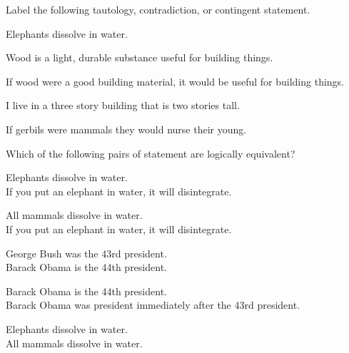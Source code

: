 \noindent \problempart Label the following tautology, contradiction, or contingent statement.
\begin{exercises}
\item Elephants dissolve in water. 
\item Wood is a light, durable substance useful for building things. 
\item If wood were a good building material, it would be useful for building things. 
\item I live in a three story building that is two stories tall. 
\item If gerbils were mammals they would nurse their young. 
\end{exercises}

\noindent \problempart Which of the following pairs of statement are logically equivalent? 

\begin{exercises}
\item Elephants dissolve in water.	\\
	If you put an elephant in water, it will disintegrate.
\item All mammals dissolve in water.\\		
	If you put an elephant in water, it will disintegrate. 
\item George Bush was the 43rd president. \\
	 Barack Obama is the 44th president. 
\item Barack Obama is the 44th president. \\
	  Barack Obama was president immediately after the 43rd president. 
\item Elephants dissolve in water. 	\\	
	All mammals dissolve in water. 
\end{exercises}



